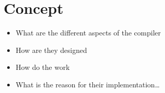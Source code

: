 \chapter{Concept}
\begin{itemize}
    \item What are the different aspects of the compiler
    \item How are they designed
    \item How do the work
    \item What is the reason for their implementation\dots
\end{itemize}





